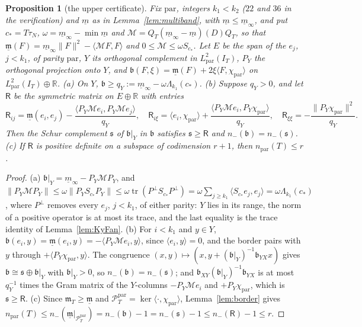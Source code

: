\documentclass[11pt]{amsart}
\newtheorem{proposition}[theorem]{Proposition}
\theoremstyle{definition}
\theoremstyle{remark}
\newcommand{\R}{\mathbb R}
\newcommand{\PT}{\mathcal P_T}
\newcommand{\IT}{I_T}
\newcommand{\mT}{\mathfrak m_T}
\begin{document}
\begin{proposition}[the upper certificate]\label{prop:haynsworth}
Fix $\mathrm{par}$, integers $k_1<k_2$ ($22$ and $36$ in the verification) and $\underline m$ as in
Lemma~\ref{lem:multiband}, with $\underline m\le\underline m_\infty$, and put $c_*=T\tau_N$,
$\omega=\underline m_\infty-\min\underline m$ and $\mathcal M=Q_T(\underline m_\infty-\underline m)(D)Q_T$,
so that $\underline{\mathfrak m}(F)=\underline m_\infty\|F\|^2-\langle\mathcal MF,F\rangle$ and
$0\le\mathcal M\le\omega S_{c_*}$. Let $E$ be the span of the $e_j$, $j<k_1$, of parity $\mathrm{par}$,
$Y$ its orthogonal complement in $L^2_{\mathrm{par}}(\IT)$, $P_Y$ the orthogonal projection onto $Y$,
and $\mathfrak b(F,\xi)=\underline{\mathfrak m}(F)+2\xi\langle F,\chi_{\mathrm{par}}\rangle$ on
$L^2_{\mathrm{par}}(\IT)\oplus\R$.
\emph{(a)} On $Y$, $\mathfrak b\ge q_Y:=\underline m_\infty-\omega\Lambda_{k_1}(c_*)$.
\emph{(b)} Suppose $q_Y>0$, and let $\mathsf R$ be the symmetric matrix on $E\oplus\R$ with entries
\[
\mathsf R_{ij}=\underline{\mathfrak m}(e_i,e_j)-\frac{\langle P_Y\mathcal Me_i,P_Y\mathcal Me_j\rangle}{q_Y},\quad
\mathsf R_{i\xi}=\langle e_i,\chi_{\mathrm{par}}\rangle+\frac{\langle P_Y\mathcal Me_i,P_Y\chi_{\mathrm{par}}\rangle}{q_Y},\quad
\mathsf R_{\xi\xi}=-\frac{\|P_Y\chi_{\mathrm{par}}\|^2}{q_Y}.
\]
Then the Schur complement $\mathfrak s$ of $\mathfrak b|_Y$ in $\mathfrak b$ satisfies $\mathfrak s\ge\mathsf R$
and $n_-(\mathfrak b)=n_-(\mathfrak s)$.
\emph{(c)} If $\mathsf R$ is positive definite on a subspace of codimension $r+1$, then
$n_{\mathrm{par}}(T)\le r$.
\end{proposition}
\begin{proof}
(a) $\mathfrak b|_Y=\underline m_\infty-P_Y\mathcal MP_Y$, and
$\|P_Y\mathcal MP_Y\|\le\omega\|P_YS_{c_*}P_Y\|\le\omega\operatorname{tr}(P^\perp S_{c_*}P^\perp)
=\omega\sum_{j\ge k_1}\langle S_{c_*}e_j,e_j\rangle=\omega\Lambda_{k_1}(c_*)$, where $P^\perp$ removes every
$e_j$, $j<k_1$, of either parity: $Y$ lies in its range, the norm of a positive operator is at most its
trace, and the last equality is the trace identity of Lemma~\ref{lem:KyFan}. (b) For $i<k_1$ and $y\in Y$,
$\mathfrak b(e_i,y)=\underline{\mathfrak m}(e_i,y)=-\langle P_Y\mathcal Me_i,y\rangle$, since $\langle e_i,y\rangle=0$,
and the border pairs with $y$ through $+\langle P_Y\chi_{\mathrm{par}},y\rangle$. The congruence
$(x,y)\mapsto(x,y+(\mathfrak b|_Y)^{-1}\mathfrak b_{YX}x)$ gives $\mathfrak b\cong\mathfrak s\oplus\mathfrak b|_Y$
with $\mathfrak b|_Y>0$, so $n_-(\mathfrak b)=n_-(\mathfrak s)$; and
$\mathfrak b_{XY}(\mathfrak b|_Y)^{-1}\mathfrak b_{YX}$ is at most $q_Y^{-1}$ times the Gram matrix of the
$Y$-columns $-P_Y\mathcal Me_i$ and $+P_Y\chi_{\mathrm{par}}$, which is $\mathfrak s\ge\mathsf R$.
(c) Since $\mT\ge\underline{\mathfrak m}$ and $\PT^{\mathrm{par}}=\ker\langle\cdot,\chi_{\mathrm{par}}\rangle$,
Lemma~\ref{lem:border} gives
$n_{\mathrm{par}}(T)\le n_-(\underline{\mathfrak m}|_{\PT^{\mathrm{par}}})=n_-(\mathfrak b)-1=n_-(\mathfrak s)-1\le n_-(\mathsf R)-1\le r$.
\end{proof}
\end{document}
